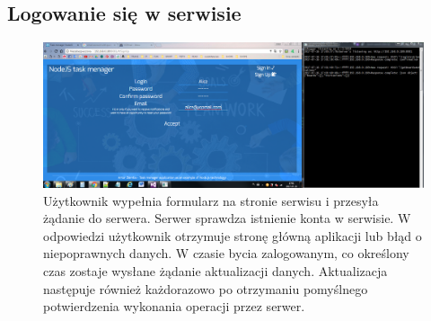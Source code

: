\documentclass[12pt]{report}
\begin{document}
\subsection{Logowanie się w serwisie}
\begin{figure}[!hb]
\centering
\includegraphics[width=\textwidth,height=\textheight,keepaspectratio]{42.png}
\captionsetup{labelformat=empty}
\caption[]{Użytkownik wypełnia formularz na stronie serwisu i przesyła żądanie do serwera. Serwer sprawdza istnienie konta w serwisie. 
W odpowiedzi użytkownik otrzymuje stronę główną aplikacji lub błąd o niepoprawnych danych.
W czasie bycia zalogowanym, co określony czas zostaje wysłane żądanie aktualizacji danych. 
Aktualizacja następuje również każdorazowo po otrzymaniu pomyślnego potwierdzenia wykonania operacji przez serwer.}
\end{figure}

\newpage 
\end{document}
